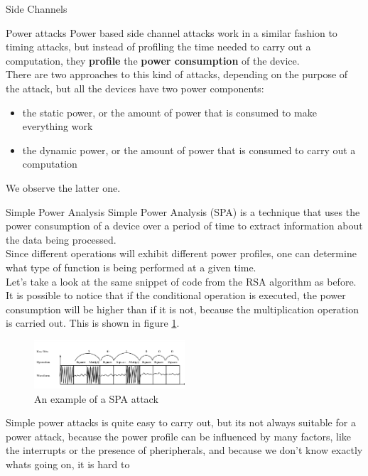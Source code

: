 \begin{section}{Side Channels}
  \begin{subsection}{Power attacks}
    Power based side channel attacks work in a similar fashion to timing attacks, but instead of 
    profiling the time needed to carry out a computation, they \textbf{profile} the \textbf{power 
    consumption} of the device.\\
    There are two approaches to this kind of attacks, depending on the purpose of the attack, but
    all the devices have two power components:
    \begin{itemize}
      \item the static power, or the amount of power that is consumed to make everything work
      \item the dynamic power, or the amount of power that is consumed to carry out a computation
    \end{itemize}
    We observe the latter one.
    \begin{subsubsection}{Simple Power Analysis}
      Simple Power Analysis (SPA) is a technique that uses the power consumption of a device over a
      period of time to extract information about the data being processed.\\
      Since different operations will exhibit different power profiles, one can determine what type
      of function is being performed at a given time.\\
      Let's take a look at the same snippet of code from the RSA algorithm as before. It is possible
      to notice that if the conditional operation is executed, the power consumption will be higher
      than if it is not, because the multiplication operation is carried out. This is shown in
      figure \ref{fig:power attack}.\\
      \begin{figure}[h]
        \centering
        \includegraphics[width=0.5\textwidth]{img/hardware/power attack.png}
        \caption{An example of a SPA attack}
        \label{fig:power attack}
      \end{figure}
      Simple power attacks is quite easy to carry out, but its not always suitable for a power
      attack, because the power profile can be influenced by many factors, like the interrupts or
      the presence of pheripherals, and because we don't know exactly whats going on, it is hard to

\end{subsubsection}
\end{subsection}
\end{section}
